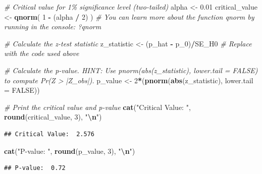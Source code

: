 \documentclass[
  11pt,
]{article}
\newenvironment{Shaded}{\begin{snugshade}}{\end{snugshade}}
\newcommand{\AttributeTok}[1]{\textcolor[rgb]{0.13,0.29,0.53}{#1}}
\newcommand{\CommentTok}[1]{\textcolor[rgb]{0.56,0.35,0.01}{\textit{#1}}}
\newcommand{\ConstantTok}[1]{\textcolor[rgb]{0.56,0.35,0.01}{#1}}
\newcommand{\DecValTok}[1]{\textcolor[rgb]{0.00,0.00,0.81}{#1}}
\newcommand{\FloatTok}[1]{\textcolor[rgb]{0.00,0.00,0.81}{#1}}
\newcommand{\FunctionTok}[1]{\textcolor[rgb]{0.13,0.29,0.53}{\textbf{#1}}}
\newcommand{\NormalTok}[1]{#1}
\newcommand{\OtherTok}[1]{\textcolor[rgb]{0.56,0.35,0.01}{#1}}
\newcommand{\SpecialCharTok}[1]{\textcolor[rgb]{0.81,0.36,0.00}{\textbf{#1}}}
\newcommand{\StringTok}[1]{\textcolor[rgb]{0.31,0.60,0.02}{#1}}
\begin{document}
\begin{Shaded}
\begin{Highlighting}[]
\CommentTok{\# Critical value for 1\% significance level (two{-}tailed)}
\NormalTok{alpha }\OtherTok{\textless{}{-}} \FloatTok{0.01}
\NormalTok{critical\_value }\OtherTok{\textless{}{-}} \FunctionTok{qnorm}\NormalTok{( }\DecValTok{1} \SpecialCharTok{{-}}\NormalTok{ (alpha }\SpecialCharTok{/} \DecValTok{2}\NormalTok{) )  }\CommentTok{\# You can learn more about the function \textasciigrave{}qnorm\textasciigrave{} by running in the console: ?qnorm}

\CommentTok{\# Calculate the z{-}test statistic}
\NormalTok{z\_statistic }\OtherTok{\textless{}{-}}\NormalTok{ (p\_hat }\SpecialCharTok{{-}}\NormalTok{ p\_0)}\SpecialCharTok{/}\NormalTok{SE\_H0   }\CommentTok{\# Replace with the code used above}

\CommentTok{\# Calculate the p{-}value. HINT: Use \textasciigrave{}pnorm(abs(z\_statistic), lower.tail = FALSE)\textasciigrave{} to compute Pr(Z \textgreater{} |Z\_obs|).}
\NormalTok{p\_value }\OtherTok{\textless{}{-}} \DecValTok{2}\SpecialCharTok{*}\NormalTok{(}\FunctionTok{pnorm}\NormalTok{(}\FunctionTok{abs}\NormalTok{(z\_statistic), }\AttributeTok{lower.tail =} \ConstantTok{FALSE}\NormalTok{)) }

\CommentTok{\# Print the critical value and p{-}value}
\FunctionTok{cat}\NormalTok{(}\StringTok{"Critical Value: "}\NormalTok{, }\FunctionTok{round}\NormalTok{(critical\_value, }\DecValTok{3}\NormalTok{), }\StringTok{"}\SpecialCharTok{\textbackslash{}n}\StringTok{"}\NormalTok{)}
\end{Highlighting}
\end{Shaded}

\begin{verbatim}
## Critical Value:  2.576
\end{verbatim}

\begin{Shaded}
\begin{Highlighting}[]
\FunctionTok{cat}\NormalTok{(}\StringTok{"P{-}value: "}\NormalTok{, }\FunctionTok{round}\NormalTok{(p\_value, }\DecValTok{3}\NormalTok{), }\StringTok{"}\SpecialCharTok{\textbackslash{}n}\StringTok{"}\NormalTok{)}
\end{Highlighting}
\end{Shaded}

\begin{verbatim}
## P-value:  0.72
\end{verbatim}
\end{document}

